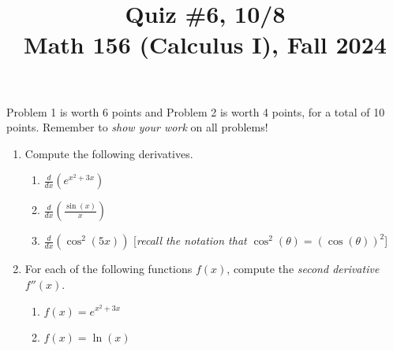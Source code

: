\documentclass[11pt]{article}
\title{Quiz \#6, 10/8 \\ Math 156 (Calculus I), Fall 2024}
\date{}
\begin{document}
\maketitle

\thispagestyle{empty}

\vspace{-2cm}

Problem 1 is worth 6 points and Problem 2 is worth 4 points, for a total of 10 points. Remember to \emph{show your work} on all problems!

\begin{enumerate}
\item Compute the following derivatives.
\begin{enumerate}
\item $\displaystyle \frac{d}{dx} \left( e^{x^2+3x} \right)$
\item $\displaystyle \frac{d}{dx} \left( \frac{\sin(x)}{x} \right)$
\item $\displaystyle \frac{d}{dx} \left( \cos^2(5x) \right) $ \hfill [\emph{recall the notation that $\cos^2(\theta)= (\cos(\theta))^2$}]
\end{enumerate}

\vspace{2.6in}

\item For each of the following functions $f(x)$, compute the \emph{second derivative} $f''(x)$.
\begin{enumerate}
\item $f(x) = e^{x^2+3x}$
\item $f(x) = \ln(x)$
\end{enumerate}
\end{enumerate}
\end{document}
